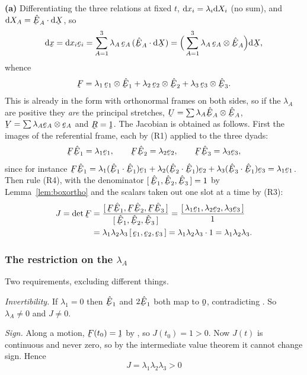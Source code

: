 \begin{solution}
\textbf{(a)} Differentiating the three relations at fixed $t$,
$\mathrm{d} x_{i}=\lambda_{i}\mathrm{d} X_{i}$ (no sum), and
$\dl X_{A}=\ip{\hbE_{A}}{\dl\bX}$, so
\[
   \dl\bx=\dl x_{i}\be_{i}
   =\sum_{A=1}^{3}\lambda_{A}\,\be_{A}\,(\ip{\hbE_{A}}{\dl\bX})
   =\Big(\sum_{A=1}^{3}\lambda_{A}\,\be_{A}\otimes\hbE_{A}\Big)\dl\bX ,
\]
whence
\[
   \bF=\lambda_{1}\,\be_{1}\otimes\hbE_{1}
      +\lambda_{2}\,\be_{2}\otimes\hbE_{2}
      +\lambda_{3}\,\be_{3}\otimes\hbE_{3}.
\]
This is already in the form  with orthonormal frames on both
sides, so if the $\lambda_{A}$ are positive they \emph{are} the principal
stretches, $\bU=\sum\lambda_{A}\hbE_{A}\otimes\hbE_{A}$,
$\bV=\sum\lambda_{A}\be_{A}\otimes\be_{A}$ and $\bR=\shift$. The Jacobian
is
obtained as follows. First the images of the referential frame, each by
(R1) applied to the three dyads:
\[
   \bF\hbE_{1}=\lambda_{1}\be_{1},\qquad
   \bF\hbE_{2}=\lambda_{2}\be_{2},\qquad
   \bF\hbE_{3}=\lambda_{3}\be_{3},
\]
since for instance $\bF\hbE_{1}=\lambda_{1}(\ip{\hbE_{1}}{\hbE_{1}})\be_{1}
+\lambda_{2}(\ip{\hbE_{2}}{\hbE_{1}})\be_{2}
+\lambda_{3}(\ip{\hbE_{3}}{\hbE_{1}})\be_{3}
=\lambda_{1}\be_{1}$. Then rule (R4), with the denominator
$\tbox{\hbE_{1}}{\hbE_{2}}{\hbE_{3}}=1$ by Lemma~\ref{lem:boxortho} and
the scalars taken out one slot at a time by (R3):
\[
\begin{aligned}
   J=\det\bF
   &=\frac{\tbox{\bF\hbE_{1}}{\bF\hbE_{2}}{\bF\hbE_{3}}}
          {\tbox{\hbE_{1}}{\hbE_{2}}{\hbE_{3}}}
    =\frac{\tbox{\lambda_{1}\be_{1}}{\lambda_{2}\be_{2}}
                {\lambda_{3}\be_{3}}}{1}\\
   &=\lambda_{1}\lambda_{2}\lambda_{3}\,
     \tbox{\be_{1}}{\be_{2}}{\be_{3}}
    =\lambda_{1}\lambda_{2}\lambda_{3}\cdot1
    =\lambda_{1}\lambda_{2}\lambda_{3}.
\end{aligned}
\]
\subsubsection*{The restriction on the $\lambda_{A}$}

Two requirements, excluding different things.

\emph{Invertibility.} If $\lambda_{1}=0$ then $\hbE_{1}$ and $2\hbE_{1}$
both map to $\bze$, contradicting . So $\lambda_{A}\neq0$ and
$J\neq0$.

\emph{Sign.} Along a motion, $\bF(t_{0})=\shift$ by , so
$J(t_{0})=1>0$. Now $J(t)$ is continuous and never zero, so by the
intermediate value theorem it cannot change sign. Hence
\[
   \boxed{\ J=\lambda_{1}\lambda_{2}\lambda_{3}>0\ }
\]


\end{solution}
